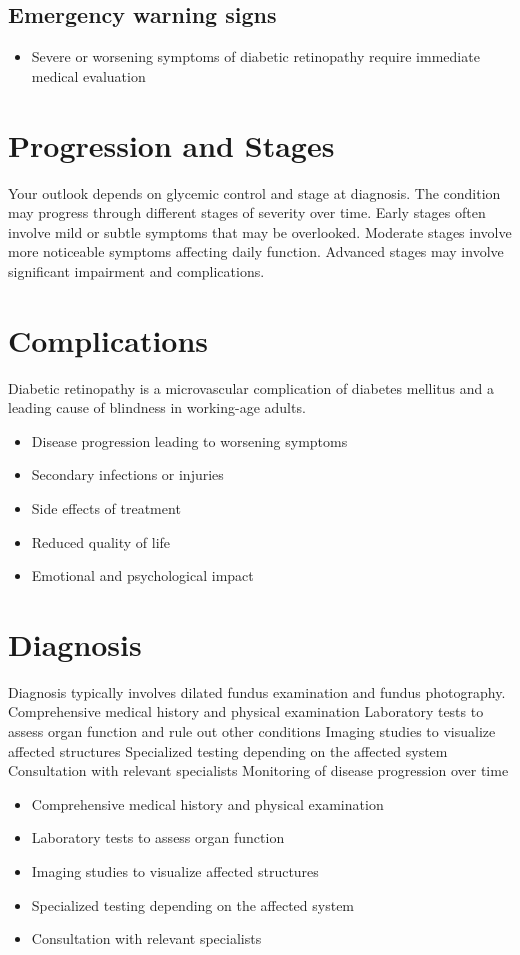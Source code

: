 \subsection{Emergency warning signs}
\begin{itemize}[noitemsep]
  \item Severe or worsening symptoms of diabetic retinopathy require immediate medical evaluation
\end{itemize}
\section{Progression and Stages}
Your outlook depends on glycemic control and stage at diagnosis. The condition may progress through different stages of severity over time. Early stages often involve mild or subtle symptoms that may be overlooked. Moderate stages involve more noticeable symptoms affecting daily function. Advanced stages may involve significant impairment and complications.
\section{Complications}
Diabetic retinopathy is a microvascular complication of diabetes mellitus and a leading cause of blindness in working-age adults.

\begin{itemize}[noitemsep]
  \item Disease progression leading to worsening symptoms
  \item Secondary infections or injuries
  \item Side effects of treatment
  \item Reduced quality of life
  \item Emotional and psychological impact
\end{itemize}
\section{Diagnosis}
Diagnosis typically involves dilated fundus examination and fundus photography. Comprehensive medical history and physical examination Laboratory tests to assess organ function and rule out other conditions Imaging studies to visualize affected structures Specialized testing depending on the affected system Consultation with relevant specialists Monitoring of disease progression over time

\begin{itemize}[noitemsep]
  \item Comprehensive medical history and physical examination
  \item Laboratory tests to assess organ function
  \item Imaging studies to visualize affected structures
  \item Specialized testing depending on the affected system
  \item Consultation with relevant specialists
\end{itemize}
